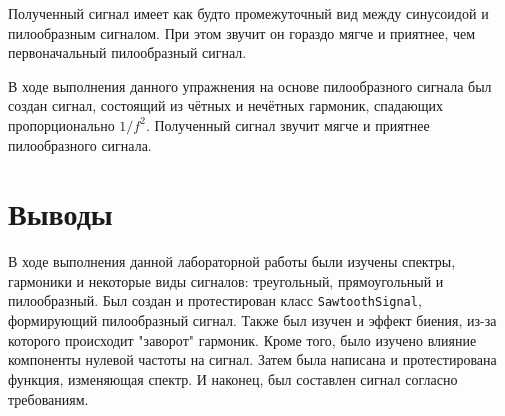 \documentclass[a4paper, 14pt]{extarticle}
\begin{document}
    Полученный сигнал имеет как будто промежуточный вид между синусоидой и пилообразным сигналом.
    При этом звучит он гораздо мягче и приятнее, чем первоначальный пилообразный сигнал.

    В ходе выполнения данного упражнения на основе пилообразного сигнала был создан сигнал, состоящий из чётных и
    нечётных гармоник, спадающих пропорционально $1/f^2$. Полученный сигнал звучит мягче и приятнее пилообразного сигнала.

    \newpage

    \section{Выводы}
    \label{sec:conclusions}

    В ходе выполнения данной лабораторной работы были изучены спектры, гармоники и некоторые виды сигналов: треугольный, прямоугольный и пилообразный.
    Был создан и протестирован класс \texttt{SawtoothSignal}, формирующий пилообразный сигнал.
    Также был изучен и эффект биения, из-за которого происходит "заворот" гармоник. Кроме того, было изучено влияние компоненты нулевой частоты на сигнал.
    Затем была написана и протестирована функция, изменяющая спектр. И наконец, был составлен сигнал согласно требованиям.
\end{document}
